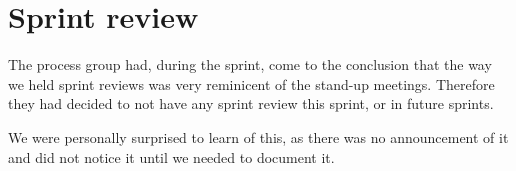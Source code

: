 \section{Sprint review}
The process group had, during the sprint, come to the conclusion that the way we held sprint reviews was very reminicent of the stand-up meetings.
Therefore they had decided to not have any sprint review this sprint, or in future sprints. 

We were personally surprised to learn of this, as there was no announcement of it and did not notice it until we needed to document it.
